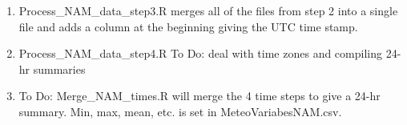\begin{enumerate}
\item Process\_NAM\_data\_step3.R merges all of the files from step 2 into a single file and adds a column at the beginning giving the UTC time stamp.

\item Process\_NAM\_data\_step4.R To Do: deal with time zones and compiling 24-hr summaries

\item To Do: Merge\_NAM\_times.R will merge the 4 time steps to give a 24-hr summary. Min, max, mean, etc. is set in MeteoVariabesNAM.csv.








\end{enumerate}
